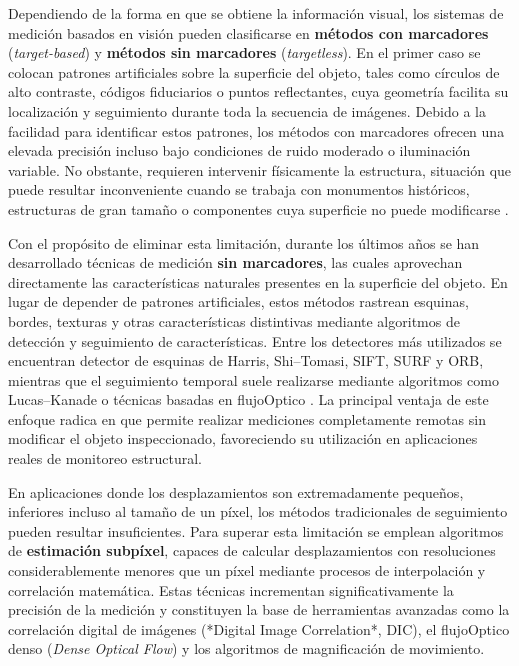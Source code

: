 Dependiendo de la forma en que se obtiene la información visual, los sistemas de medición basados en visión pueden clasificarse en \textbf{métodos con marcadores} (\textit{target-based}) y \textbf{métodos sin marcadores} (\textit{targetless}). En el primer caso se colocan patrones artificiales sobre la superficie del objeto, tales como círculos de alto contraste, códigos fiduciarios o puntos reflectantes, cuya geometría facilita su localización y seguimiento durante toda la secuencia de imágenes. Debido a la facilidad para identificar estos patrones, los métodos con marcadores ofrecen una elevada precisión incluso bajo condiciones de ruido moderado o iluminación variable. No obstante, requieren intervenir físicamente la estructura, situación que puede resultar inconveniente cuando se trabaja con monumentos históricos, estructuras de gran tamaño o componentes cuya superficie no puede modificarse \cite{cheng2025vision}.

Con el propósito de eliminar esta limitación, durante los últimos años se han desarrollado técnicas de medición \textbf{sin marcadores}, las cuales aprovechan directamente las características naturales presentes en la superficie del objeto. En lugar de depender de patrones artificiales, estos métodos rastrean esquinas, bordes, texturas y otras características distintivas mediante algoritmos de detección y seguimiento de características. Entre los detectores más utilizados se encuentran detector de esquinas de Harris, Shi--Tomasi, \gls{SIFT}, \gls{SURF} y \gls{ORB}, mientras que el seguimiento temporal suele realizarse mediante algoritmos como Lucas--Kanade o técnicas basadas en \gls{flujoOptico} \cite{fleet2006flow,szeliski2022vision}. La principal ventaja de este enfoque radica en que permite realizar mediciones completamente remotas sin modificar el objeto inspeccionado, favoreciendo su utilización en aplicaciones reales de monitoreo estructural.

En aplicaciones donde los desplazamientos son extremadamente pequeños, inferiores incluso al tamaño de un píxel, los métodos tradicionales de seguimiento pueden resultar insuficientes. Para superar esta limitación se emplean algoritmos de \textbf{estimación subpíxel}, capaces de calcular desplazamientos con resoluciones considerablemente menores que un píxel mediante procesos de interpolación y correlación matemática. Estas técnicas incrementan significativamente la precisión de la medición y constituyen la base de herramientas avanzadas como la correlación digital de imágenes (*Digital Image Correlation*, DIC), el \gls{flujoOptico} denso (\textit{Dense Optical Flow}) y los algoritmos de magnificación de movimiento.

